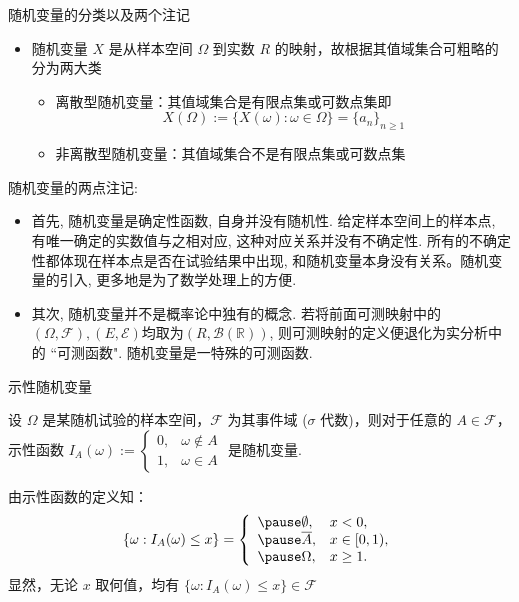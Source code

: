 \documentclass[Prob-All.tex]{subfiles}
\begin{document}
\begin{frame}{随机变量的分类以及两个注记}
	\begin{itemize}[<+-|alert@+>]
		\item 随机变量 $X$ 是从样本空间 $\Omega$ 到实数 $R$ 的映射，故根据其值域集合可粗略的分为两大类
		      \begin{itemize}[<+-|alert@+>]
			      \item 离散型随机变量：其值域集合是有限点集或可数点集即
			            \[X(\Omega):=\{X(\omega):\omega\in \Omega\}=\{a_n\}_{n\geq 1}\]
			      \item 非离散型随机变量：其值域集合不是有限点集或可数点集
		      \end{itemize}
	\end{itemize}
	\pause
	\begin{rmk} 随机变量的两点注记:
		\begin{itemize}[<+-|alert@+>]
			\item 首先, 随机变量是确定性函数, 自身并没有随机性. 给定样本空间上的样本点, 有唯一确定的实数值与之相对应, 这种对应关系并没有不确定性. 所有的不确定性都体现在样本点是否在试验结果中出现, 和随机变量本身没有关系。随机变量的引入, 更多地是为了数学处理上的方便.
			\item 其次, 随机变量并不是概率论中独有的概念. 若将前面可测映射中的$(\Omega, \mathcal{F}), (E, \mathcal{E})$均取为$(R, \mathcal{B}(\mathbb{R}))$, 则可测映射的定义便退化为实分析中的 ``可测函数". 随机变量是一特殊的可测函数.
		\end{itemize}

	\end{rmk}

\end{frame}












\begin{frame}{示性随机变量}
	\begin{exam}
		设 $\Omega$ 是某随机试验的样本空间，$\mathcal{F}$ 为其事件域 ($\sigma$ 代数)，则对于任意的 $A\in \mathcal{F}$， 示性函数
		$I_A(\omega):=\left\{
			\begin{array}{ll}
				0, & \omega\notin A \\
				1, & \omega\in A
			\end{array}\right.$ 是随机变量.
	\end{exam}

	\pause
	\jieda  由示性函数的定义知：
	\begin{eqnarray*}
		\{\omega:I_A(\omega)\le x\}=\left\{
		\begin{array}{ll}
			\pause \emptyset, & x<0,        \\ \pause
			\overline{A},     & x\in [0,1), \\\pause
			\Omega,           & x\ge 1.
		\end{array}
		\right.
	\end{eqnarray*}
	\pause
	显然，无论 $x$ 取何值，均有 $\{\omega:I_A (\omega)\le x\}\in \mathcal{F}$


\end{frame}
\end{document}
